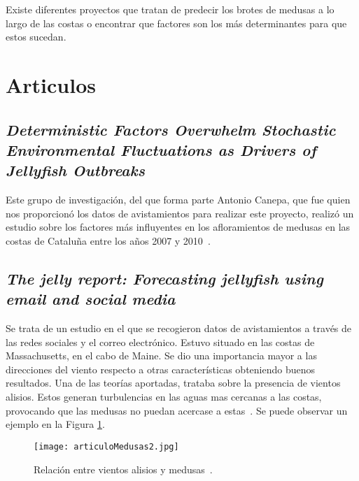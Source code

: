 

Existe diferentes proyectos que tratan de predecir los brotes de medusas a lo largo de las costas o encontrar que factores son los más determinantes para que estos sucedan.

\section{Articulos}

\subsection{\emph{Deterministic Factors Overwhelm Stochastic Environmental Fluctuations as Drivers of Jellyfish Outbreaks}}

Este grupo de investigación, del que forma parte Antonio Canepa, que fue quien nos proporcionó los datos de avistamientos para realizar este proyecto, realizó un estudio sobre los factores más influyentes en los afloramientos de medusas en las costas de Cataluña entre los años 2007 y 2010~\cite{art:ArticuloCanepa_1}.

\subsection{\emph{The jelly report: Forecasting jellyfish using email and social media}}

Se trata de un estudio en el que se recogieron datos de avistamientos a través de las redes sociales y el correo electrónico. Estuvo situado en las costas de Massachusetts, en el cabo de Maine. Se dio una importancia mayor a las direcciones del viento respecto a otras características obteniendo buenos resultados. Una de las teorías aportadas, trataba sobre la presencia de vientos alisios. Estos generan turbulencias en las aguas mas cercanas a las costas, provocando que las medusas no puedan acercase a estas~\cite{articulomedusas2}. Se puede observar un ejemplo en la Figura \ref{articulomedusas2}.
\begin{figure}%
	\centering
	\texttt{[image: articuloMedusas2.jpg]}
	\caption[Relación entre vientos alisios y medusas]{Relación entre vientos alisios y medusas~\cite{articulomedusas2}.}\label{articulomedusas2}
\end{figure}

